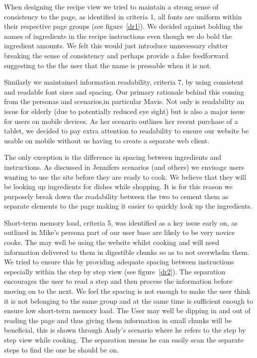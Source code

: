 When designing the recipe view we tried to maintain a strong sense of consistency to the page, as identified in criteria 1, all fonts are uniform within their respective page groups (see figure~\ref{dr1}). We decided against bolding the names of ingredients in the recipe instructions even though we do bold the ingredient amounts. We felt this would just introduce unnecessary clutter breaking the sense of consistency and perhaps provide a false feedforward suggesting to the the user that the name is pressable when it is not.

Similarly we maintained information readability, criteria 7, by using consistent and readable font sizes and spacing. Our primary rationale behind this coming from the personas and scenarios,in particular Mavis. Not only is readability an issue for elderly (due to potentially reduced eye sight) but is also a major issue for users on mobile devices. As her scenario outlines her recent purchase of a tablet, we decided to pay extra attention to readability to ensure our website be usable on mobile without us having to create a separate web client.

The only exception is the difference in spacing between ingredients and instructions. As discussed in Jennifers scenarios (and others) we envisage users wanting to use the site before they are ready to cook. We believe that they will be looking up ingredients for dishes while shopping. It is for this reason we purposely break down the readability between the two to cement them as separate elements to the page making it easier to quickly look up the ingredients.

Short-term memory load, criteria 5, was identified as a key issue early on, as outlined in Mike's persona part of our user base are likely to be very novice cooks. The may well be using the website whilst cooking and will need information delivered to them in digestible chunks so as to not overwhelm them. We tried to ensure this by providing adequate spacing between instructions especially within the step by step view (see figure~\ref{dr2}). The separation encourages the user to read a step and then process the information before moving on to the next. We feel the spacing is not enough to make the user think it is not belonging to the same group and at the same time is sufficient enough to ensure low short-term memory load. The User may well be dipping in and out of reading the page and thus giving them information in small chunks will be beneficial, this is shown through Andy's scenario where he refers to the step by step view while cooking. The separation means he can easily scan the separate steps to find the one he should be on.

